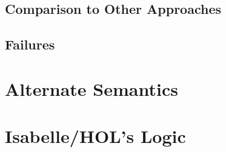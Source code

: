 \documentclass[11pt]{article}
\numberwithin{equation}{subsection}
\begin{document}
\subsection{Comparison to Other Approaches}
\subsection{Failures}


% 

\appendix
\section{Alternate Semantics}
\label{alternative}


\section{Isabelle/HOL's Logic}

\pagebreak
{}


\end{document}
